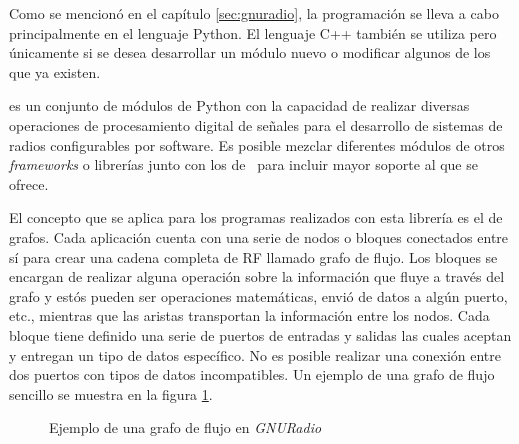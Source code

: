 Como se mencion\'o en el cap\'itulo \ref{sec:gnuradio}, la programaci\'on se lleva a
cabo principalmente en el lenguaje Python. El lenguaje C++ tambi\'en se utiliza
pero \'unicamente si se desea desarrollar un m\'odulo nuevo o modificar algunos de
los que ya existen.

\gnuradio es un conjunto de m\'odulos de Python con la capacidad de
realizar diversas operaciones de procesamiento digital de se\~nales para el desarrollo de
sistemas de radios configurables por software. Es posible mezclar diferentes
m\'odulos de otros \emph{frameworks} o librer\'ias junto con los de \gnuradio\
para incluir mayor soporte al que se ofrece.

El concepto que se aplica para los programas realizados con esta librer\'ia es
el de grafos. Cada aplicaci\'on cuenta con una serie de nodos o bloques
conectados entre s\'i para crear una cadena completa de RF llamado grafo de
flujo. Los bloques se encargan de realizar alguna operaci\'on sobre la
informaci\'on que fluye a trav\'es del grafo y est\'os pueden ser operaciones
matem\'aticas, envi\'o de datos a alg\'un puerto, etc., mientras que las aristas
transportan la informaci\'on entre los nodos. Cada bloque tiene definido una
serie de puertos de entradas y salidas las cuales aceptan y entregan un tipo de
datos espec\'ifico. No es posible realizar una conexi\'on entre dos puertos con
tipos de datos incompatibles. Un ejemplo de una grafo de flujo sencillo se
muestra en la figura \ref{fig:radioflow}.

\begin{figure}[hpt]
  \centering
  \vspace{0.3in}
	\vspace{0.5in}
	\caption{Ejemplo de una grafo de flujo en \emph{GNURadio}}
	\label{fig:radioflow}
\end{figure}

